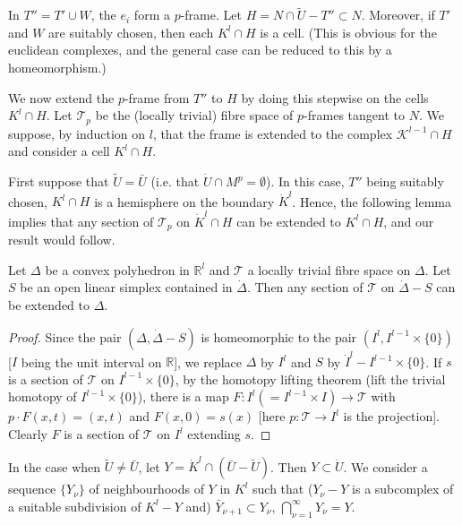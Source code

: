 In $T''=T'\cup W$, the $e_{i}$ form a $p$-frame. Let $H=N\cap
\widetilde{U}-T''\subset N$. Moreover, if $T'$ and $W$ are suitably
chosen, then each $K^{l}\cap H$ is a cell. (This is obvious for the
euclidean complexes, and the general case can be reduced to this by a
homeomorphism.) 

We now extend the $p$-frame from $T''$ to $H$ by doing this stepwise
on the cells $K^{l}\cap H$. Let $\mathscr{T}_{p}$ be the (locally
trivial) fibre space of $p$-frames tangent to $N$. We suppose, by
induction on $l$, that the frame is extended to the complex
$\mathscr{K}^{l-1}\cap H$ and consider a cell $K^{l}\cap H$.


First suppose that $\widetilde{U}=\bar{U}$ (i.e. that $\dot{U}\cap
M^{p}=\emptyset$). In this case, $T''$ being suitably chosen,
$K^{l}\cap H$ is a hemisphere on the boundary $\dot{K}^{l}$. Hence,
the following lemma implies that any section of $\mathscr{T}_{p}$ on
$\dot{K}^{l}\cap H$ can be extended to $K^{l}\cap H$, and our result
would follow.

\begin{lemma*} %
Let $\Delta$ be a convex polyhedron in $\mathbb{R}^{l}$ and
$\mathscr{T}$ a locally trivial fibre space on $\Delta$. Let $S$ be an
open linear simplex contained in $\dot{\Delta}$. Then any section of
$\mathscr{T}$ on $\dot{\Delta}-S$ can be extended to $\Delta$.
\end{lemma*}

\begin{proof} %
Since the pair $(\Delta,\dot{\Delta}-S)$ is homeomorphic to the pair
$(I^{l},I^{l-1}\times\{0\})$ [$I$ being the unit interval on
  $\mathbb{R}$], we replace $\Delta$ by $I^{l}$ and $S$ by
$\dot{I}^{l}-I^{l-1}\times\{0\}$. If $s$ is a section of $\mathscr{T}$
on $I^{l-1}\times\{0\}$, by the homotopy lifting theorem (lift the
trivial homotopy of $I^{l-1}\times\{0\}$), there is a map
$F:I^{l}(=I^{l-1}\times I)\to \mathscr{T}$ with\pageoriginale $p\cdot
F(x,t)=(x,t)$ and $F(x,0)=s(x)$ [here $p:\mathscr{T}\to I^{l}$ is the
  projection]. Clearly $F$ is a section of $\mathscr{T}$ on $I^{l}$
extending $s$.
\end{proof}

In the case when $\widetilde{U}\neq \bar{U}$, let $Y=\dot{K}^{l}\cap
(\bar{U}-\widetilde{U})$. Then $Y\subset \dot{U}$. We consider a
sequence $\{Y_{\nu}\}$ of neighbourhoods of $Y$ in $K^{l}$ such that
($Y_{\nu}-Y$ is a subcomplex of a suitable subdivision of $K^{l}-Y$
and) $\bar{Y}_{\nu+1}\subset Y_{\nu}$,
$\bigcap^{\infty}_{\nu=1}Y_{\nu}=Y$. 

